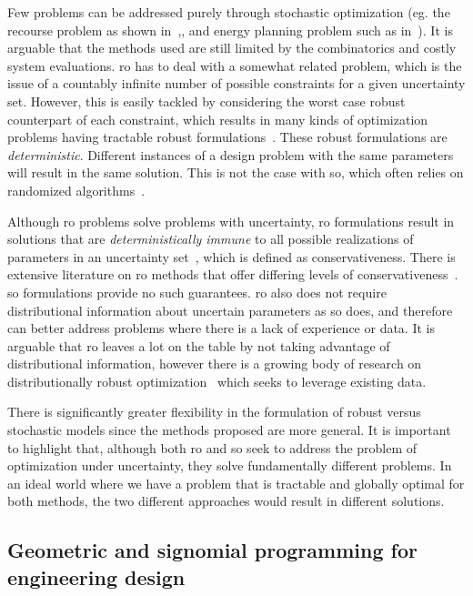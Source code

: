 Few problems can be addressed purely through stochastic optimization (eg. the recourse problem as
shown in~\cite{Kall1982},\cite{Higle1991}, and energy planning problem such as in~\cite{Pereira1991}).
It is arguable that the methods used are still limited by the combinatorics and costly
system evaluations.
\gls{ro} has to deal with a somewhat related problem, which is the issue of a countably infinite number
of possible constraints for a given uncertainty set. However, this is easily
tackled by considering the worst case robust counterpart of each constraint, which
results in many kinds of optimization problems having tractable robust formulations~\cite{Bertsimas2011}.
These robust formulations are \emph{deterministic}. Different instances of a design problem with
the same parameters will result in the same solution. This is not the case with \gls{so},
which often relies on randomized algorithms~\cite{Shmoys2004}.

Although \gls{ro} problems solve problems with uncertainty,
\gls{ro} formulations result in solutions that are \emph{deterministically immune}
to all possible realizations of parameters in an uncertainty set~\cite{Bertsimas2011},
which is defined as conservativeness. There is extensive literature on \gls{ro} methods
that offer differing levels of conservativeness~\cite{Bertsimas2004}. \gls{so} formulations
provide no such guarantees. \gls{ro} also does not require distributional information
about uncertain parameters as \gls{so} does, and therefore can better address problems where there
is a lack of experience or data. It is arguable that \gls{ro}
leaves a lot on the table by not taking advantage of distributional information,
however there is a growing body of research on distributionally robust optimization~\cite{Bertsimas2017}
which seeks to leverage existing data.

There is significantly greater flexibility in the formulation of robust versus stochastic models
since the methods proposed are more general. It is important to highlight that,
although both \gls{ro} and \gls{so} seek to address the problem
of optimization under uncertainty, they solve fundamentally different problems. In an ideal world where
we have a problem that is tractable and globally optimal for both methods, the two different
approaches would result in different solutions.

\subsection{Geometric and signomial programming for engineering design}

